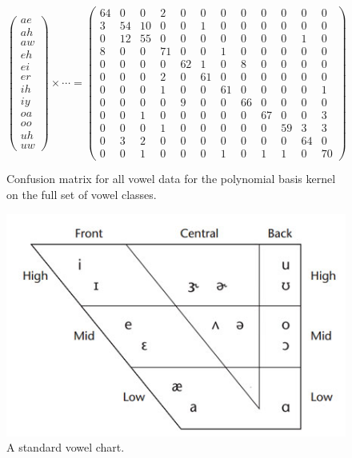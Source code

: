 \documentclass[twoside]{article}
\begin{document}
\setcounter{MaxMatrixCols}{12}
\begin{figure}
\caption {Confusion matrix for all vowel data for the polynomial basis kernel on the full set of vowel classes.}
\centering
$\begin{pmatrix}
ae \\
ah \\
aw \\
eh \\
ei \\
er \\
ih \\
iy \\
oa \\
oo \\
uh \\
uw
\end{pmatrix} \times \cdots  =
\begin{pmatrix}
64 & 0 & 0 & 2 & 0 & 0 & 0&  0&  0&  0&  0&  0 \\
 3 &54 &10 & 0 & 0 & 1 & 0&  0&  0&  0&  0&  0 \\
 0 &12 &55 & 0 & 0 & 0 & 0&  0&  0&  0&  1&  0 \\
 8 & 0 & 0 &71 & 0 & 0 & 1&  0&  0&  0&  0&  0 \\
 0 & 0 & 0 & 0 &62 & 1 & 0&  8&  0&  0&  0&  0 \\
 0 & 0 & 0 & 2 & 0 &61 & 0&  0&  0&  0&  0&  0 \\
 0 & 0 & 0 & 1 & 0 & 0 &61&  0&  0&  0&  0&  1 \\
 0 & 0 & 0 & 0 & 9 & 0 & 0& 66&  0&  0&  0&  0 \\
 0 & 0 & 1 & 0 & 0 & 0 & 0&  0& 67&  0&  0&  3 \\
 0 & 0 & 0 & 1 & 0 & 0 & 0&  0&  0& 59&  3&  3 \\
 0 & 3 & 2 & 0 & 0 & 0 & 0&  0&  0&  0& 64&  0 \\
 0 & 0 & 1 & 0 & 0 & 0 & 1&  0&  1&  1 & 0& 70
\end{pmatrix}$
\end{figure}

\begin{figure}
\caption{A standard vowel chart.}
\centering
\includegraphics[scale=.5]{../figures/vowel-chart.jpg}
\end{figure}
\end{document}
